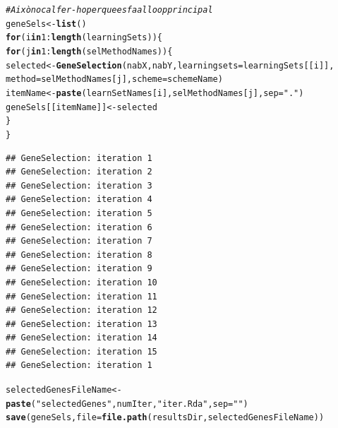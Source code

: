 \documentclass{article}\usepackage[]{graphicx}\usepackage[]{color}
\makeatletter
\newcommand{\hlnum}[1]{\textcolor[rgb]{0.686,0.059,0.569}{#1}}%
\newcommand{\hlstr}[1]{\textcolor[rgb]{0.192,0.494,0.8}{#1}}%
\newcommand{\hlcom}[1]{\textcolor[rgb]{0.678,0.584,0.686}{\textit{#1}}}%
\newcommand{\hlopt}[1]{\textcolor[rgb]{0,0,0}{#1}}%
\newcommand{\hlstd}[1]{\textcolor[rgb]{0.345,0.345,0.345}{#1}}%
\newcommand{\hlkwa}[1]{\textcolor[rgb]{0.161,0.373,0.58}{\textbf{#1}}}%
\newcommand{\hlkwb}[1]{\textcolor[rgb]{0.69,0.353,0.396}{#1}}%
\newcommand{\hlkwc}[1]{\textcolor[rgb]{0.333,0.667,0.333}{#1}}%
\newcommand{\hlkwd}[1]{\textcolor[rgb]{0.737,0.353,0.396}{\textbf{#1}}}%
\newenvironment{kframe}{%
 \def\at@end@of@kframe{}%
 \ifinner\ifhmode%
  \def\at@end@of@kframe{\end{minipage}}%
  \begin{minipage}{\columnwidth}%
 \fi\fi%
 \def\FrameCommand##1{\hskip\@totalleftmargin \hskip-\fboxsep
 \colorbox{shadecolor}{##1}\hskip-\fboxsep
     \hskip-\linewidth \hskip-\@totalleftmargin \hskip\columnwidth}%
 \MakeFramed {\advance\hsize-\width
   \@totalleftmargin\z@ \linewidth\hsize
   \@setminipage}}%
 {\par\unskip\endMakeFramed%
 \at@end@of@kframe}
\newenvironment{knitrout}{}{} %
\makeatother
\begin{document}
\begin{knitrout}
\color{fgcolor}\begin{kframe}
\begin{alltt}
\hlcom{# Això no cal fer-ho perque es fa al loop principal}
\hlstd{geneSels}\hlkwb{<-} \hlkwd{list}\hlstd{()}
\hlkwa{for} \hlstd{(i} \hlkwa{in} \hlnum{1}\hlopt{:}\hlkwd{length}\hlstd{(learningSets))\{}
  \hlkwa{for} \hlstd{(j} \hlkwa{in} \hlnum{1}\hlopt{:}\hlkwd{length}\hlstd{(selMethodNames))\{}
    \hlstd{selected}  \hlkwb{<-} \hlkwd{GeneSelection}\hlstd{(nabX, nabY,} \hlkwc{learningsets} \hlstd{= learningSets[[i]],}
                               \hlkwc{method} \hlstd{= selMethodNames[j],} \hlkwc{scheme}\hlstd{=schemeName)}
    \hlstd{itemName}\hlkwb{<-} \hlkwd{paste}\hlstd{(learnSetNames[i], selMethodNames[j],} \hlkwc{sep}\hlstd{=}\hlstr{"."}\hlstd{)}
    \hlstd{geneSels[[itemName]]}\hlkwb{<-}\hlstd{selected}
  \hlstd{\}}
\hlstd{\}}
\end{alltt}
\begin{verbatim}
## GeneSelection: iteration 1 
## GeneSelection: iteration 2 
## GeneSelection: iteration 3 
## GeneSelection: iteration 4 
## GeneSelection: iteration 5 
## GeneSelection: iteration 6 
## GeneSelection: iteration 7 
## GeneSelection: iteration 8 
## GeneSelection: iteration 9 
## GeneSelection: iteration 10 
## GeneSelection: iteration 11 
## GeneSelection: iteration 12 
## GeneSelection: iteration 13 
## GeneSelection: iteration 14 
## GeneSelection: iteration 15 
## GeneSelection: iteration 1
\end{verbatim}


{\ttfamily\noindent\color{warningcolor}{\#\# Warning in library(package, lib.loc = lib.loc, character.only = TRUE, logical.return = TRUE, : there is no package called 'randomForest'}}

{\ttfamily\noindent\bfseries{}}\begin{alltt}
\hlstd{selectedGenesFileName} \hlkwb{<-} \hlkwd{paste}\hlstd{(}\hlstr{"selectedGenes"}\hlstd{,numIter,}\hlstr{"iter.Rda"}\hlstd{,} \hlkwc{sep}\hlstd{=}\hlstr{""}\hlstd{)}
\hlkwd{save}\hlstd{(geneSels,} \hlkwc{file}\hlstd{=}\hlkwd{file.path}\hlstd{(resultsDir,selectedGenesFileName))}
\end{alltt}
\end{kframe}
\end{knitrout}
\end{document}
